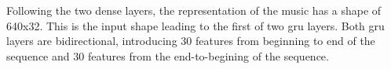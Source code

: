
Following the two dense layers, the representation of the
music has a shape of 640x32. This is the input shape leading
to the first of two \gls{gru} layers. Both \gls{gru} layers
are bidirectional, introducing 30 features from beginning to
end of the sequence and 30 features from the end-to-begining
of the sequence.


